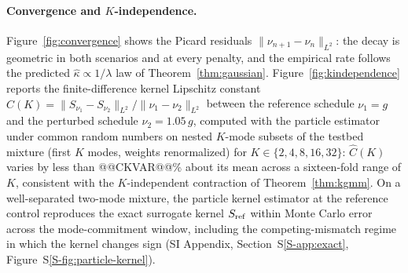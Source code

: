     \paragraph{Convergence and $K$-independence.} Figure~\ref{fig:convergence} shows the Picard residuals $\|\nu_{n+1}-\nu_n\|_{L^2}$: the decay is geometric in both scenarios and at every penalty, and the empirical rate follows the predicted $\hat\kappa\propto1/\lambda$ law of Theorem~\ref{thm:gaussian}. Figure~\ref{fig:kindependence} reports the finite-difference kernel Lipschitz constant $\widehat C(K)=\|S_{\nu_1}-S_{\nu_2}\|_{L^2}/\|\nu_1-\nu_2\|_{L^2}$ between the reference schedule $\nu_1=g$ and the perturbed schedule $\nu_2=1.05\,g$, computed with the particle estimator under common random numbers on nested $K$-mode subsets of the testbed mixture (first $K$ modes, weights renormalized) for $K\in\{2,4,8,16,32\}$: $\widehat C(K)$ varies by less than @@CKVAR@@\% about its mean across a sixteen-fold range of $K$, consistent with the $K$-independent contraction of Theorem~\ref{thm:kgmm}.
    On a well-separated two-mode mixture, the particle kernel estimator at the reference control reproduces the exact surrogate kernel $S_{\rm ref}$ within Monte Carlo error across the mode-commitment window, including the competing-mismatch regime in which the kernel changes sign (SI Appendix, Section~S\ref{S-app:exact}, Figure~S\ref{S-fig:particle-kernel}).
